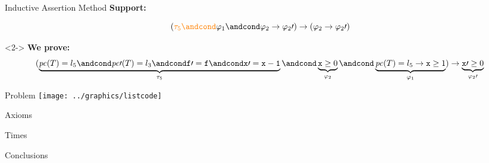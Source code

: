 \documentclass[10pt,notes,compress,usetitleprogressbar,aspectratio=1610]{beamer}
\newcommand{\pc}{\ensuremath{\mathit{pc}}\xspace}
\begin{document}
\begin{frame}{Inductive Assertion Method}
	\textbf{Support:}


	\[
		(\textcolor{orange}{\tau_5 \andcond} \varphi_1 \andcond \varphi_2 \to \varphi_2\prime ) \rightarrow (\varphi_2\to\varphi_2\prime )
	\]

	\begin{block}<2->{}
	\vspace{-1cm}
		\textbf{We prove:}
		\begin{equation*}
			(
				\underbrace{\pc(T) = l_5 \andcond \pc\prime (T) = l_3 \andcond \mathtt{f\prime =f} \andcond \mathtt{x\prime =x-1}}_{\tau_5} \andcond \underbrace{\mathtt{x} \geq 0}_{\varphi_2} \andcond \underbrace{\pc(T) = l_5 \to \mathtt{x} \geq 1}_{\varphi_1}
			) 
				\to \underbrace{\mathtt{x}\prime  \geq 0}_{\varphi_2\prime }\\\\
		\end{equation*}
	\end{block}



\end{frame}

\begin{frame}{Problem}
\texttt{[image: ../graphics/listcode]}
\end{frame}

\begin{frame}{Axioms}
\end{frame}



\begin{frame}{Times}
\end{frame}


\begin{frame}{Conclusions}
\end{frame}
\end{document}
